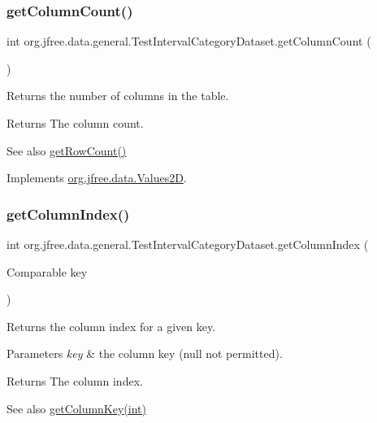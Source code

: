 \subsubsection{\texorpdfstring{get\+Column\+Count()}{getColumnCount()}}
{\footnotesize\ttfamily int org.\+jfree.\+data.\+general.\+Test\+Interval\+Category\+Dataset.\+get\+Column\+Count (\begin{DoxyParamCaption}{ }\end{DoxyParamCaption})}

Returns the number of columns in the table.

\begin{DoxyReturn}{Returns}
The column count.
\end{DoxyReturn}
\begin{DoxySeeAlso}{See also}
\mbox{\hyperlink{classorg_1_1jfree_1_1data_1_1general_1_1_test_interval_category_dataset_a7e80e09ec80cc2e473d4257ff3d59af5}{get\+Row\+Count()}} 
\end{DoxySeeAlso}


Implements \mbox{\hyperlink{interfaceorg_1_1jfree_1_1data_1_1_values2_d_a212e32802dc2f32e0fb641740137c685}{org.\+jfree.\+data.\+Values2D}}.

\mbox{\label{classorg_1_1jfree_1_1data_1_1general_1_1_test_interval_category_dataset_a90dc04f1966adbcc80f505554c8afd40}} 
\subsubsection{\texorpdfstring{get\+Column\+Index()}{getColumnIndex()}}
{\footnotesize\ttfamily int org.\+jfree.\+data.\+general.\+Test\+Interval\+Category\+Dataset.\+get\+Column\+Index (\begin{DoxyParamCaption}\item[{Comparable}]{key }\end{DoxyParamCaption})}

Returns the column index for a given key.


\begin{DoxyParams}{Parameters}
{\em key} & the column key ({\ttfamily null} not permitted).\\
\hline
\end{DoxyParams}
\begin{DoxyReturn}{Returns}
The column index.
\end{DoxyReturn}
\begin{DoxySeeAlso}{See also}
\mbox{\hyperlink{classorg_1_1jfree_1_1data_1_1general_1_1_test_interval_category_dataset_a55b29571a2a0e450010e23a8ce7ad872}{get\+Column\+Key(int)}} 
\end{DoxySeeAlso}


